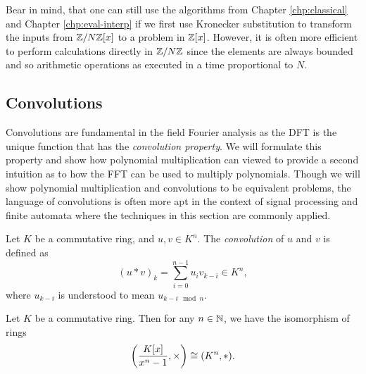 Bear in mind, that one can still use the algorithms from Chapter \ref{chp:classical} and Chapter \ref{chp:eval-interp} if we first use Kronecker substitution to transform the inputs from ${\mathbb Z}/N{\mathbb Z}[x]$ to a problem in ${\mathbb Z}[x]$. However, it is often more efficient to perform calculations directly in ${\mathbb Z}/N{\mathbb Z}$ since the elements are always bounded and so arithmetic operations as executed in a time proportional to $N$.


\subsection{Convolutions}

Convolutions are fundamental in the field Fourier analysis as the DFT is the unique function that has the \emph{convolution property}. We will formulate this property and show how polynomial multiplication can viewed to provide a second intuition as to how the FFT can be used to multiply polynomials. Though we will show polynomial multiplication and convolutions to be equivalent problems, the language of convolutions is often more apt in the context of signal processing and finite automata where the techniques in this section are commonly applied.

\begin{definition}
    Let $K$ be a commutative ring, and $u, v \in K^n$. The \textit{convolution} of $u$ and $v$ is defined as
    \[
        (u \ast v)_k = \sum^{n-1}_{i=0} u_i v_{k-i} \in K^n,
    \]
    where $u_{k-i}$ is understood to mean $u_{k-i \mod n}$.
\end{definition}

\begin{proposition}\label{prop:poly-conv-iso}
    Let $K$ be a commutative ring. Then for any $n \in {\mathbb N}$, we have the isomorphism of rings
    \[
        \left(\frac{K[x]}{x^n - 1}, \times\right) \cong (K^n, \ast).
    \]
\end{proposition}

